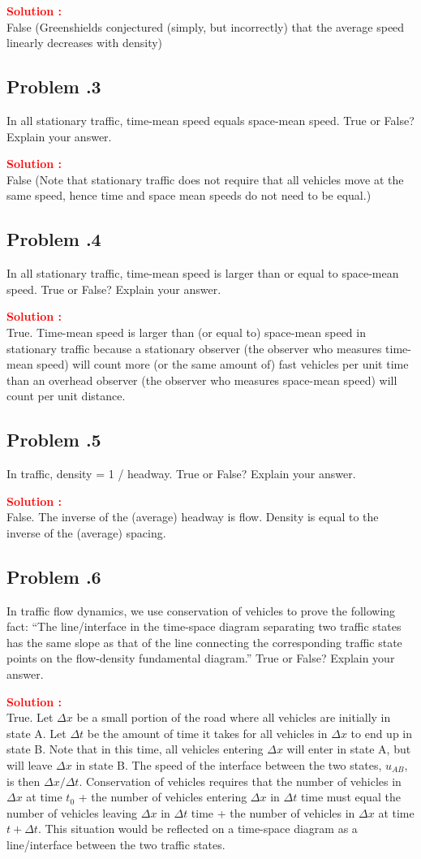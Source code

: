 \documentclass[12pt]{article}
\newcommand{\customsubsection}[1]{
  \subsection*{Problem \thesection.#1}
}
\begin{document}
\textbf{\textcolor{red}{Solution :}} \\
False (Greenshields conjectured (simply, but incorrectly) that the average speed linearly decreases with density)
\newpage


\customsubsection{3}
In all stationary traffic, time-mean speed equals space-mean speed. True or False? Explain your answer. 


\textbf{\textcolor{red}{Solution :}} \\
False (Note that stationary traffic does not require that all vehicles move at the same speed, hence time and space mean speeds do not need to be equal.)
\newpage



\customsubsection{4}
In all stationary traffic, time-mean speed is larger than or equal to space-mean speed. True or False? Explain your answer.


\textbf{\textcolor{red}{Solution :}} \\
True. Time-mean speed is larger than (or equal to) space-mean speed in stationary traffic because a stationary observer (the observer who measures time-mean speed) will count more (or the same amount of) fast vehicles per unit time than an overhead observer (the observer who measures space-mean speed) will count per unit distance. 
\newpage



\customsubsection{5}
In traffic, density = 1 / headway. True or False? Explain your answer. 


\textbf{\textcolor{red}{Solution :}} \\
False. The inverse of the (average) headway is flow. Density is equal to the inverse of the (average) spacing.
\newpage


\customsubsection{6}
In traffic flow dynamics, we use conservation of vehicles to prove the following fact: ``The line/interface in the time-space diagram separating two traffic states has the same slope as that of the line connecting the corresponding traffic state points on the flow-density fundamental diagram.”  True or False? Explain your answer. 


\textbf{\textcolor{red}{Solution :}} \\
True. Let $\Delta x$ be a small portion of the road where all vehicles are initially in state A. Let $\Delta t$ be the amount of time it takes for all vehicles in $\Delta x$ to end up in state B. Note that in this time, all vehicles entering $\Delta x$ will enter in state A, but will leave $\Delta x$ in state B. The speed of the interface between the two states, $u_{AB}$, is then $\Delta x / \Delta t$. Conservation of vehicles requires that the number of vehicles in $\Delta x$ at time $t_0$ + the number of vehicles entering $\Delta x$ in $\Delta t$ time must equal the number of vehicles leaving $\Delta x$ in $\Delta t$ time + the number of vehicles in $\Delta x$ at time $t + \Delta t$. This situation would be reflected on a time-space diagram as a line/interface between the two traffic states.
\end{document}
